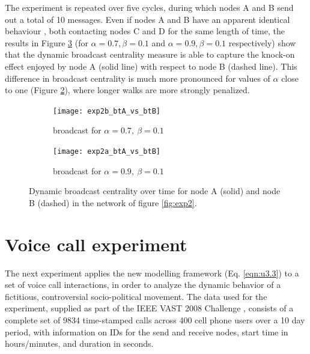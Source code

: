 The experiment is repeated over five cycles, during which nodes A and B send out a total of 10 messages. Even if nodes A and B have an apparent identical behaviour , both contacting nodes C and D for the same length of time, the results in Figure \ref{fig:twobt} (for $\alpha = 0.7, \beta = 0.1$ and $\alpha = 0.9 , \beta = 0.1$ respectively) show that the dynamic broadcast centrality measure is able to capture the knock-on effect  enjoyed by node A (solid line) with respect to node B (dashed line). This difference in broadcast centrality is much more pronounced for values of $\alpha$ close to one (Figure \ref{fig:bt6}), where longer walks are more strongly penalized.

\begin{figure}
     \centering
     \begin{subfigure}[b]{0.49\textwidth}
         \centering
         \texttt{[image: exp2b\_btA\_vs\_btB]}
         \caption{broadcast for $\alpha = 0.7 ,~\beta = 0.1$}
         \label{fig:bt5}
     \end{subfigure}
     \hfill
     \begin{subfigure}[b]{0.49\textwidth}
         \centering
         \texttt{[image: exp2a\_btA\_vs\_btB]}
         \caption{broadcast for $\alpha = 0.9 ,~\beta = 0.1$}
         \label{fig:bt6}
     \end{subfigure}
     \caption{Dynamic broadcast centrality over time for node A (solid) and node B (dashed) in the network of figure \ref{fig:exp2}.}
     \label{fig:twobt}
\end{figure}




\section{Voice call experiment}
\label{sec:voicecall}
The next experiment applies the new modelling framework (Eq. \ref{eqn:u3.3}) to a set of voice call interactions, in order to analyze the dynamic behavior of a fictitious, controversial socio-political movement. The data used for the experiment, supplied as part of the IEEE VAST 2008 Challenge \cite{grinstein2008vast}, consists of a complete set of 9834 time-stamped calls across 400 cell phone users over a 10 day period, with information on IDs for the send and receive nodes, start time in hours/minutes, and duration in seconds.

